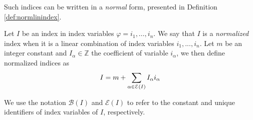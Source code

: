 Such indices can be written in a \textit{normal} form, presented in Definition \ref{def:normlinindex}.

\begin{definition}\label{def:normlinindex}
    Let $I$ be an index in index variables $\varphi = i_1,\dots,i_n$. We say that $I$ is a \textit{normalized} index when it is a linear combination of index variables $i_1, ..., i_n$. Let $m$ be an integer constant and $I_\alpha\in\mathbb{Z}$ the coefficient of variable $i_\alpha$, we then define normalized indices as
    \begin{align*}
        I = m + \sum_{\alpha\in \mathcal{E}(I)} I_\alpha i_\alpha
    \end{align*}
    
    
    We use the notation $\mathcal{B}(I)$ and $\mathcal{E}(I)$ to refer to the constant and unique identifiers of index variables of $I$, respectively.
\end{definition}

